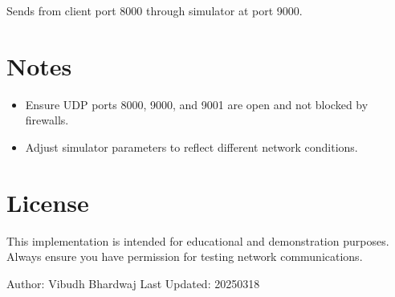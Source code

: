 \documentclass[letterpaper,10pt,english]{sphinxmanual}
\begin{document}
\sphinxAtStartPar
Sends  from client port 8000 through simulator at port 9000.


\section{Notes}
\label{\detokenize{documentation:notes}}\begin{itemize}
\item {} 
\sphinxAtStartPar
Ensure UDP ports 8000, 9000, and 9001 are open and not blocked by firewalls.

\item {} 
\sphinxAtStartPar
Adjust simulator parameters to reflect different network conditions.

\end{itemize}


\section{License}
\label{\detokenize{documentation:license}}
\sphinxAtStartPar
This implementation is intended for educational and demonstration purposes. Always ensure you have permission for testing network communications.

\sphinxAtStartPar
Author: Vibudh Bhardwaj
Last Updated: 2025\sphinxhyphen{}03\sphinxhyphen{}18



\renewcommand{\indexname}{Index}
\printindex
\end{document}

